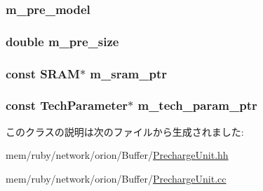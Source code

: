 \label{classPrechargeUnit_a0ab919f80d0ba7b69d7bbbe332f5a6e7}
\hypertarget{classPrechargeUnit_ad066eb2d564a668078dbdf1ac6236c5e}{
\subsubsection[{m\_\-pre\_\-model}]{ {\bf m\_\-pre\_\-model}}}
\label{classPrechargeUnit_ad066eb2d564a668078dbdf1ac6236c5e}
\hypertarget{classPrechargeUnit_a1f5999661eb253d9493b6020b6525802}{
\subsubsection[{m\_\-pre\_\-size}]{\setlength{\rightskip}{0pt plus 5cm}double {\bf m\_\-pre\_\-size}}}
\label{classPrechargeUnit_a1f5999661eb253d9493b6020b6525802}
\hypertarget{classPrechargeUnit_aab5dce4213ab482c5e1909bfc96d62af}{
\subsubsection[{m\_\-sram\_\-ptr}]{\setlength{\rightskip}{0pt plus 5cm}const {\bf SRAM}$\ast$ {\bf m\_\-sram\_\-ptr}}}
\label{classPrechargeUnit_aab5dce4213ab482c5e1909bfc96d62af}
\hypertarget{classPrechargeUnit_a11d1644aa2bfe0e16783dface6fadf13}{
\subsubsection[{m\_\-tech\_\-param\_\-ptr}]{\setlength{\rightskip}{0pt plus 5cm}const {\bf TechParameter}$\ast$ {\bf m\_\-tech\_\-param\_\-ptr}}}
\label{classPrechargeUnit_a11d1644aa2bfe0e16783dface6fadf13}


このクラスの説明は次のファイルから生成されました:\begin{DoxyCompactItemize}
\item 
mem/ruby/network/orion/Buffer/\hyperlink{PrechargeUnit_8hh}{PrechargeUnit.hh}\item 
mem/ruby/network/orion/Buffer/\hyperlink{PrechargeUnit_8cc}{PrechargeUnit.cc}\end{DoxyCompactItemize}
